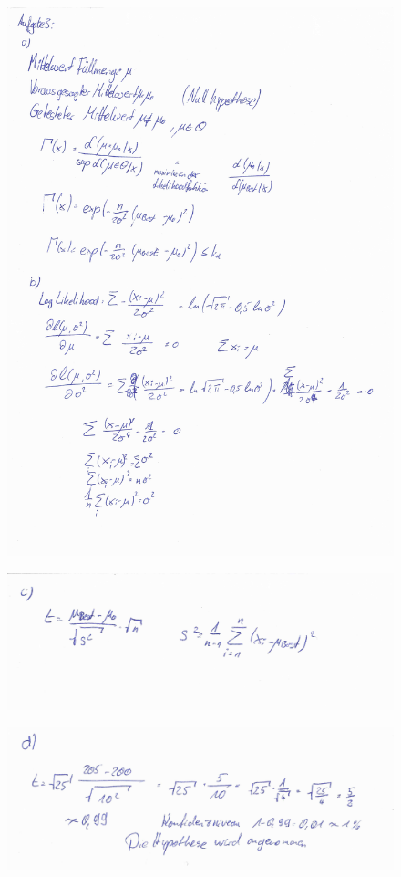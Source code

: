 \begin{figure}
  \centering
  \includegraphics[width=\textwidth]{./aufg3_1.0.jpg}
\end{figure}
\begin{figure}
  \centering
  \includegraphics[width=\textwidth]{./aufg3_1.1.jpg}
\end{figure}
\begin{figure}
  \centering
  \includegraphics[width=\textwidth]{./aufg3_1.2.jpg}
\end{figure}
